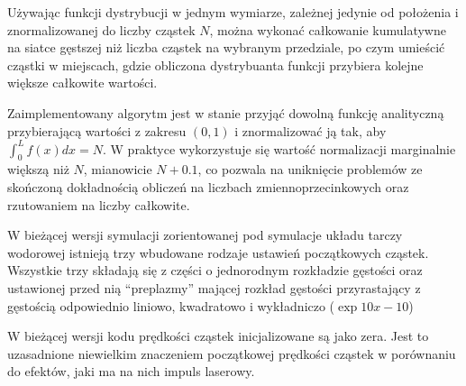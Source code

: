 Używając funkcji dystrybucji w jednym wymiarze, zależnej jedynie od
położenia i znormalizowanej do liczby cząstek $N$, można wykonać całkowanie
kumulatywne na siatce gęstszej niż liczba cząstek na wybranym przedziale,
po czym umieścić cząstki w miejscach, gdzie obliczona dystrybuanta funkcji
 przybiera kolejne większe całkowite wartości.


Zaimplementowany algorytm jest w stanie przyjąć dowolną funkcję analityczną
przybierającą  wartości z zakresu $(0, 1)$
i znormalizować ją tak, aby $\int_0^L
f(x) dx = N$. W praktyce wykorzystuje się wartość normalizacji marginalnie
większą niż $N$, mianowicie $N+0.1$, co pozwala na uniknięcie problemów ze
skończoną dokładnością obliczeń na liczbach zmiennoprzecinkowych oraz
rzutowaniem na liczby całkowite.

W bieżącej wersji symulacji zorientowanej pod symulacje układu tarczy
wodorowej istnieją trzy wbudowane rodzaje ustawień początkowych cząstek.
Wszystkie trzy składają się z części o jednorodnym rozkładzie gęstości oraz
ustawionej przed nią ``preplazmy'' mającej rozkład gęstości przyrastający z
gęstością odpowiednio liniowo, kwadratowo i wykładniczo ($\exp{10 x - 10}$)


W bieżącej wersji kodu prędkości cząstek inicjalizowane są jako zera. Jest to
uzasadnione niewielkim znaczeniem początkowej prędkości cząstek w
porównaniu do efektów, jaki ma na nich impuls laserowy.





